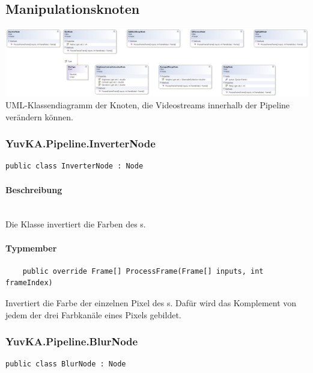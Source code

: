 \subsection{Manipulationsknoten}

\includegraphics[width=\textwidth]{YuvKA.Pipeline/manipulationnodes.png}
UML-Klassendiagramm der Knoten, die Videostreams innerhalb der Pipeline verändern können.

\subsubsection{YuvKA.Pipeline.InverterNode}
\begin{verbatim}
public class InverterNode : Node
\end{verbatim}

\paragraph{Beschreibung}~\\
Die Klasse  invertiert die Farben des s.

\paragraph{Typmember}
\begin{itemize}

	\begin{verbatim}
	public override Frame[] ProcessFrame(Frame[] inputs, int frameIndex)
	\end{verbatim}
	Invertiert die Farbe der einzelnen Pixel des s. Dafür wird das Komplement von jedem der drei Farbkanäle eines Pixels gebildet.

\end{itemize}


\subsubsection{YuvKA.Pipeline.BlurNode}

\begin{verbatim}
public class BlurNode : Node
\end{verbatim}

